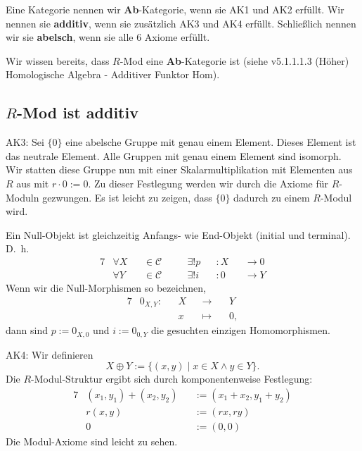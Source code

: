 \documentclass[a4paper]{amsart}
\theoremstyle{definition}
\newcommand{\CC}{\ensuremath{\mathcal{ C }}}
\begin{document}
Eine Kategorie nennen wir \textbf{Ab}-Kategorie, wenn sie AK1 und AK2 erfüllt. Wir nennen sie \textbf{additiv}, wenn sie zusätzlich AK3 und AK4 erfüllt. Schließlich nennen wir sie \textbf{abelsch}, wenn sie alle 6 Axiome erfüllt.

Wir wissen bereits, dass $R$-Mod eine \textbf{Ab}-Kategorie ist (siehe v5.1.1.1.3 (Höher) Homologische Algebra - Additiver Funktor Hom).

\subsection{$R$-Mod ist additiv}
AK3: Sei $\{0\}$ eine abelsche Gruppe mit genau einem Element. Dieses Element ist das neutrale Element. Alle Gruppen mit genau einem Element sind isomorph. Wir statten diese Gruppe nun mit einer Skalarmultiplikation mit Elementen aus $R$ aus mit $r \cdot 0 := 0$. Zu dieser Festlegung werden wir durch die Axiome für $R$-Moduln gezwungen. Es ist leicht zu zeigen, dass $\{0\}$ dadurch zu einem $R$-Modul wird.

Ein Null-Objekt ist gleichzeitig Anfangs- wie End-Objekt (initial und terminal). D.~h. 
\begin{alignat}{7}
   &\forall X &&\in \CC &&\quad \exists! p &&\colon X &&\to 0\\
   &\forall Y &&\in \CC &&\quad \exists! i &&\colon 0 &&\to Y
\end{alignat}
Wenn wir die Null-Morphismen so bezeichnen,
\begin{alignat}{7}
   &0_{X,Y} \colon &&X &&\to     &&\, Y\\
   &               &&x &&\mapsto &&\, 0,
\end{alignat}
dann sind $p := 0_{X,0}$ und $i := 0_{0,Y}$ die gesuchten einzigen Homomorphismen.

AK4: Wir definieren
\begin{equation}\label{DirekteSumme}
   X \oplus Y := \{(x,y) \mid x \in X \land y \in Y\}.
\end{equation}
Die $R$-Modul-Struktur ergibt sich durch komponentenweise Festlegung:
\begin{alignat}{7}
   &(x_1,y_1) + (x_2,y_2) &&:= (x_1 + x_2, y_1 + y_2)\\
   &r(x,y) &&:= (rx,ry)\\
   &0 &&:= (0, 0)
\end{alignat}
Die Modul-Axiome sind leicht zu sehen.
\end{document}
